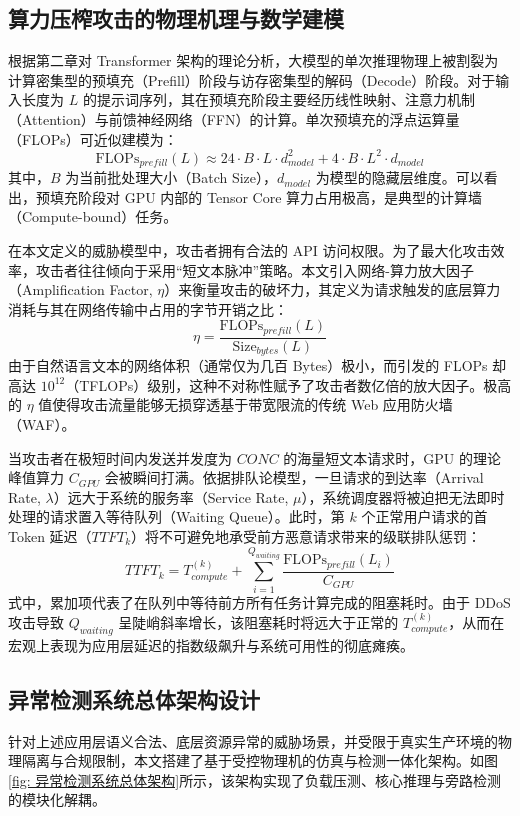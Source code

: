 \documentclass[master, vlined]{DissertUESTC}
\begin{document}
	\subsection{算力压榨攻击的物理机理与数学建模}
	根据第二章对 Transformer 架构的理论分析，大模型的单次推理物理上被割裂为计算密集型的预填充（Prefill）阶段与访存密集型的解码（Decode）阶段。对于输入长度为 $L$ 的提示词序列，其在预填充阶段主要经历线性映射、注意力机制（Attention）与前馈神经网络（FFN）的计算。单次预填充的浮点运算量（FLOPs）可近似建模为：
	\begin{equation}
		\text{FLOPs}_{prefill}(L) \approx 24 \cdot B \cdot L \cdot d_{model}^2 + 4 \cdot B \cdot L^2 \cdot d_{model}
	\end{equation}
	其中，$B$ 为当前批处理大小（Batch Size），$d_{model}$ 为模型的隐藏层维度。可以看出，预填充阶段对 GPU 内部的 Tensor Core 算力占用极高，是典型的计算墙（Compute-bound）任务。

	在本文定义的威胁模型中，攻击者拥有合法的 API 访问权限。为了最大化攻击效率，攻击者往往倾向于采用“短文本脉冲”策略。本文引入网络-算力放大因子（Amplification Factor, $\eta$）来衡量攻击的破坏力，其定义为请求触发的底层算力消耗与其在网络传输中占用的字节开销之比：
	\begin{equation}
		\eta = \frac{\text{FLOPs}_{prefill}(L)}{\text{Size}_{bytes}(L)}
	\end{equation}
	由于自然语言文本的网络体积（通常仅为几百 Bytes）极小，而引发的 FLOPs 却高达 $10^{12}$（TFLOPs）级别，这种不对称性赋予了攻击者数亿倍的放大因子。极高的 $\eta$ 值使得攻击流量能够无损穿透基于带宽限流的传统 Web 应用防火墙（WAF）。

	当攻击者在极短时间内发送并发度为 $CONC$ 的海量短文本请求时，GPU 的理论峰值算力 $C_{GPU}$ 会被瞬间打满。依据排队论模型，一旦请求的到达率（Arrival Rate, $\lambda$）远大于系统的服务率（Service Rate, $\mu$），系统调度器将被迫把无法即时处理的请求置入等待队列（Waiting Queue）。此时，第 $k$ 个正常用户请求的首 Token 延迟（$TTFT_k$）将不可避免地承受前方恶意请求带来的级联排队惩罚：
	\begin{equation}
		TTFT_k = T_{compute}^{(k)} + \sum_{i=1}^{Q_{waiting}} \frac{\text{FLOPs}_{prefill}(L_i)}{C_{GPU}}
	\end{equation}
	式中，累加项代表了在队列中等待前方所有任务计算完成的阻塞耗时。由于 DDoS 攻击导致 $Q_{waiting}$ 呈陡峭斜率增长，该阻塞耗时将远大于正常的 $T_{compute}^{(k)}$，从而在宏观上表现为应用层延迟的指数级飙升与系统可用性的彻底瘫痪。

	\subsection{异常检测系统总体架构设计}
	针对上述应用层语义合法、底层资源异常的威胁场景，并受限于真实生产环境的物理隔离与合规限制，本文搭建了基于受控物理机的仿真与检测一体化架构。如图\ref{fig: 异常检测系统总体架构}所示，该架构实现了负载压测、核心推理与旁路检测的模块化解耦。
\end{document}
